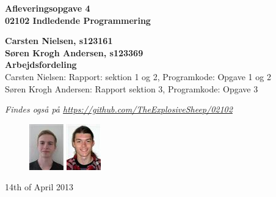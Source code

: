 \thispagestyle{empty} %
\begin{center}
\textbf{\Huge {Afleveringsopgave 4}\\ \vspace{1cm}
\huge{02102 Indledende Programmering}}
\end{center}
\vspace{1cm}
\begin{center}
\Large{\textbf{Carsten Nielsen, s123161 \\ Søren Krogh Andersen, s123369}} \\
\vspace{1cm}
\Large{\textbf{Arbejdsfordeling}} \\
Carsten Nielsen: Rapport: sektion 1 og 2, Programkode: Opgave 1 og 2 \\
Søren Krogh Andersen: Rapport sektion 3, Programkode: Opgave 3

\emph{Findes også på \url{https://github.com/TheExplosiveSheep/02102}}
\end{center}
\vspace{6cm}
\begin{figure}[h]
\hfill
\includegraphics{s123161.png}%
\includegraphics{s123369.png}%
\end{figure}
14th of April 2013

\thispagestyle{empty}
\newpage
